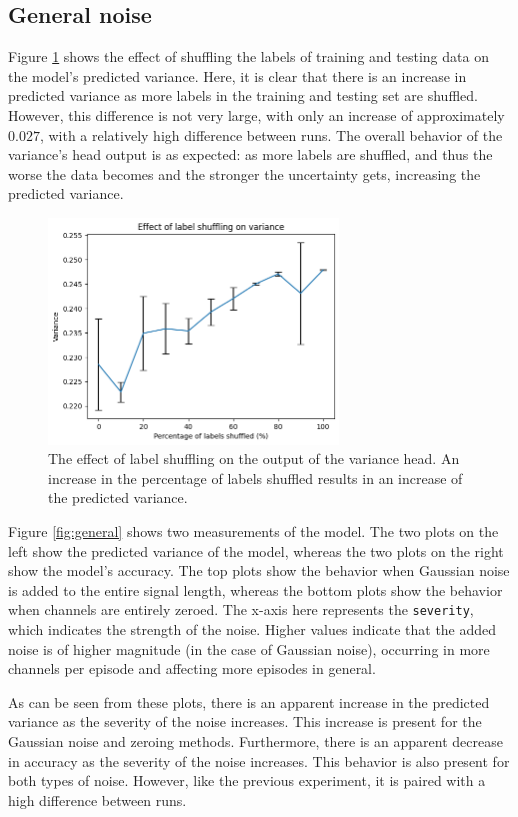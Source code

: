 \subsection{General noise}

Figure \ref{fig:label_shuffle} shows the effect of shuffling the labels of training and testing data on the model's predicted variance. Here, it is clear that there is an increase in predicted variance as more labels in the training and testing set are shuffled. However, this difference is not very large, with only an increase of approximately $0.027$, with a relatively high difference between runs. The overall behavior of the variance's head output is as expected: as more labels are shuffled, and thus the worse the data becomes and the stronger the uncertainty gets, increasing the predicted variance.

\begin{figure}[!tbp]
    \centering
        \includegraphics[width=7.7cm]{img/label_shuffle.png}
    \caption{The effect of label shuffling on the output of the variance head. An increase in the percentage of labels shuffled results in an increase of the predicted variance.}
    \label{fig:label_shuffle}
\end{figure}


Figure \ref{fig:general} shows two measurements of the model. The two plots on the left show the predicted variance of the model, whereas the two plots on the right show the model's accuracy. The top plots show the behavior when Gaussian noise is added to the entire signal length, whereas the bottom plots show the behavior when channels are entirely zeroed. The x-axis here represents the \verb|severity|, which indicates the strength of the noise. Higher values indicate that the added noise is of higher magnitude (in the case of Gaussian noise), occurring in more channels per episode and affecting more episodes in general.

As can be seen from these plots, there is an apparent increase in the predicted variance as the severity of the noise increases. This increase is present for the Gaussian noise and zeroing methods. Furthermore, there is an apparent decrease in accuracy as the severity of the noise increases. This behavior is also present for both types of noise. However, like the previous experiment, it is paired with a high difference between runs.

